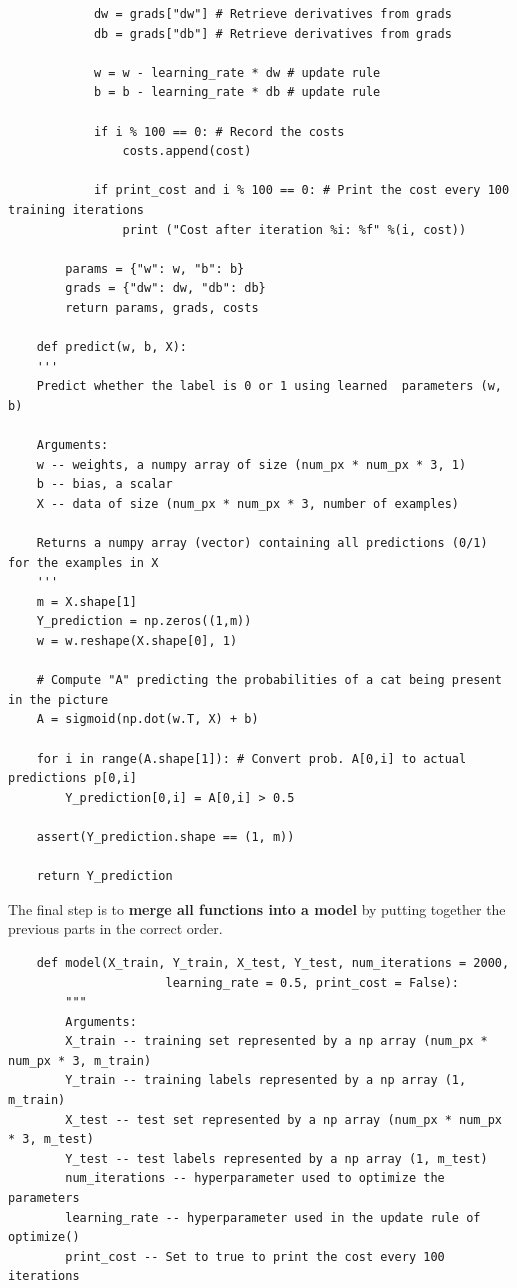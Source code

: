 \documentclass[11pt, a4paper]{article}
\begin{document}
\begin{spacing}{1.1}
\begin{lstlisting}
			dw = grads["dw"] # Retrieve derivatives from grads
			db = grads["db"] # Retrieve derivatives from grads
			
			w = w - learning_rate * dw # update rule
			b = b - learning_rate * db # update rule
			
			if i % 100 == 0: # Record the costs
				costs.append(cost)
			
			if print_cost and i % 100 == 0: # Print the cost every 100 training iterations
				print ("Cost after iteration %i: %f" %(i, cost))
		
		params = {"w": w, "b": b}
		grads = {"dw": dw, "db": db}
		return params, grads, costs
	
	def predict(w, b, X):
	'''
	Predict whether the label is 0 or 1 using learned  parameters (w, b)
	
	Arguments:
	w -- weights, a numpy array of size (num_px * num_px * 3, 1)
	b -- bias, a scalar
	X -- data of size (num_px * num_px * 3, number of examples)
	
	Returns a numpy array (vector) containing all predictions (0/1) for the examples in X
	'''
	m = X.shape[1]
	Y_prediction = np.zeros((1,m))
	w = w.reshape(X.shape[0], 1)
	
	# Compute "A" predicting the probabilities of a cat being present in the picture
	A = sigmoid(np.dot(w.T, X) + b)
	
	for i in range(A.shape[1]): # Convert prob. A[0,i] to actual predictions p[0,i]
		Y_prediction[0,i] = A[0,i] > 0.5 
	
	assert(Y_prediction.shape == (1, m))
	
	return Y_prediction \end{lstlisting} \newpage

	\noindent The final step is to \textbf{merge all functions into a model} by putting together the previous parts in the correct order. 
	\begin{lstlisting}
	def model(X_train, Y_train, X_test, Y_test, num_iterations = 2000, 
					  learning_rate = 0.5, print_cost = False):
		"""
		Arguments:
		X_train -- training set represented by a np array (num_px * num_px * 3, m_train)
		Y_train -- training labels represented by a np array (1, m_train)
		X_test -- test set represented by a np array (num_px * num_px * 3, m_test)
		Y_test -- test labels represented by a np array (1, m_test)
		num_iterations -- hyperparameter used to optimize the parameters
		learning_rate -- hyperparameter used in the update rule of optimize()
		print_cost -- Set to true to print the cost every 100 iterations
		

\end{lstlisting}
\end{spacing}
\end{document}
